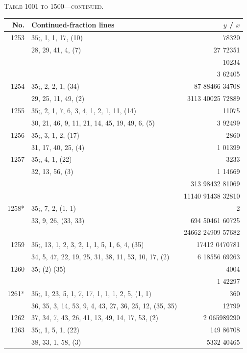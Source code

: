\documentclass[11pt]{article}
\newcommand{\peheading}{%
  \begin{center}\small\textsc{Table 1001 to 1500---continued.}\end{center}
}
\begin{document}
\peheading
\renewcommand{\arraystretch}{1.15}
{\footnotesize
\begin{longtable}{|r|p{8.5cm}|r|}
\hline
\textbf{No.} & \textbf{Continued-fraction lines} & \textbf{$y$ \;/\; $x$}\\
\hline\endhead
1253   & $35$;\; 1, 1, 1, 17, (10) & 78320 \\
       & 28, 29, 41, 4, (7) & 27 72351 \\
       & & 10234 \\
       & & 3 62405 \\
\hline
1254   & $35$;\; 1, 2, 2, 1, (34) & 87 88466 34708 \\
       & 29, 25, 11, 49, (2) & 3113 40025 72889 \\
\hline
1255   & $35$;\; 2, 2, 1, 7, 6, 3, 4, 1, 2, 1, 11, (14) & 11075 \\
       & 30, 21, 46, 9, 11, 21, 14, 45, 19, 49, 6, (5) & 3 92499 \\
\hline
1256   & $35$;\; 2, 3, 1, 2, (17) & 2860 \\
       & 31, 17, 40, 25, (4) & 1 01399 \\
\hline
1257   & $35$;\; 2, 4, 1, (22) & 3233 \\
       & 32, 13, 56, (3) & 1 14669 \\
       & & 313 98432 81069 \\
       & & 11140 91438 32810 \\
\hline
1258*  & $35$;\; 2, 7, 2, (1, 1) & 2 \\
       & 33, 9, 26, (33, 33) & 694 50461 60725 \\
       & & 24662 24909 57682 \\
\hline
1259   & $35$;\; 1, 13, 1, 2, 3, 2, 1, 1, 5, 1, 6, 4, (35) & 17412 0470781 \\
       & 34, 5, 47, 22, 19, 25, 31, 38, 11, 53, 10, 17, (2) & 6 18556 69263 \\
\hline
1260   & $35$;\; (2) (35) & 4004 \\
       & & 1 42297 \\
\hline
1261*  & $35$;\; 1, 1, 23, 5, 1, 7, 17, 1, 1, 1, 2, 5, (1, 1) & 360 \\
       & 36, 35, 3, 14, 53, 9, 4, 43, 27, 36, 25, 12, (35, 35) & 12799 \\
\hline
1262   & 37, 34, 7, 43, 26, 41, 13, 49, 14, 17, 53, (2) & 2 065989290 \\
\hline
1263   & $35$;\; 1, 1, 5, 1, (22) & 149 86708 \\
       & 38, 33, 1, 58, (3) & 5332 40465 \\

\end{longtable}}
\end{document}
